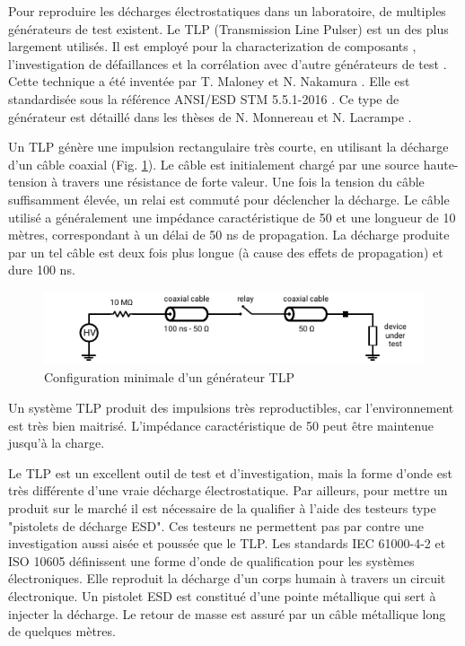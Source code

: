 Pour reproduire les décharges électrostatiques dans un laboratoire, de multiples générateurs de test existent.
Le TLP (Transmission Line Pulser) est un des plus largement utilisés.
Il est employé pour la characterization de composants \cite{TLPforESDProtectionCz, TLPthroubleshooting}, l'investigation de défaillances \cite{tlp-application-1, tlp-application-2} et la corrélation avec d'autre générateurs de test \cite{correlation-system-level-esd-tlp}.
Cette technique a été inventée par T. Maloney et N. Nakamura \cite{TLP}.
Elle est standardisée sous la référence ANSI/ESD STM 5.5.1-2016 \cite{tlp-standard}.
Ce type de générateur est détaillé dans les thèses de N. Monnereau \cite{phd-monnereau} et N. Lacrampe \cite{phd-lacrampe}.

Un TLP génère une impulsion rectangulaire très courte, en utilisant la décharge d'un câble coaxial (Fig. \ref{tlp_concept}).
Le câble est initialement chargé par une source haute-tension à travers une résistance de forte valeur.
Une fois la tension du câble suffisamment élevée, un relai est commuté pour déclencher la décharge.
Le câble utilisé a généralement une impédance caractéristique de 50\textOmega{} et une longueur de 10 mètres, correspondant à un délai de 50 ns de propagation.
La décharge produite par un tel câble est deux fois plus longue (à cause des effets de propagation) et dure 100 ns.

\begin{figure}[!h]
  \centering
  \includegraphics[width=\textwidth]{src/1/figures/tlp_concept.pdf}
  \caption{Configuration minimale d'un générateur TLP}
  \label{tlp_concept}
\end{figure}

Un système TLP produit des impulsions très reproductibles, car l'environnement est très bien maitrisé.
L'impédance caractéristique de 50\textOmega{} peut être maintenue jusqu'à la charge.

Le TLP est un excellent outil de test et d'investigation, mais la forme d'onde est très différente d'une vraie décharge électrostatique.
Par ailleurs, pour mettre un produit sur le marché il est nécessaire de la qualifier à l'aide des testeurs type "pistolets de décharge ESD".
Ces testeurs ne permettent pas par contre une investigation aussi aisée et poussée que le TLP.
Les standards IEC 61000-4-2 \cite{iec61000-4-2} et ISO 10605 \cite{iso10605} définissent une forme d'onde de qualification pour les systèmes électroniques.
Elle reproduit la décharge d'un corps humain à travers un circuit électronique.
Un pistolet ESD est constitué d'une pointe métallique qui sert à injecter la décharge.
Le retour de masse est assuré par un câble métallique long de quelques mètres.

